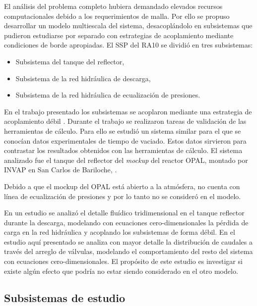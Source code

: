 El análisis del problema completo hubiera demandado elevados recursos computacionales debido a los requerimientos de malla.
Por ello se propuso desarrollar un modelo multiescala del sistema,
desacoplándolo en subsistemas que pudieron estudiarse por separado con estrategias de acoplamiento mediante condiciones de borde apropiadas.
El SSP del RA10 se dividió en tres subsistemas:

\begin{itemize}
\item Subsistema del tanque del reflector,
\item Subsistema de la red hidráulica de descarga,
\item Subsistema de la red hidráulica de ecualización de presiones.
\end{itemize}

En el trabajo presentado los subsistemas se acoplaron mediante una estrategia de acoplamiento débil \cite{ra10-paper} \cite{ra10-enief}.
Durante el trabajo se realizaron tareas de validación de las herramientas de cálculo.
Para ello se estudió un sistema similar para el que se conocían datos experimentales de tiempo de vaciado.
Estos datos sirvieron para contrastar los resultados obtenidos con las herramientas de cálculo.
El sistema analizado fue el tanque del reflector del \textit{mockup} del reactor OPAL, 
montado por INVAP en San Carlos de Bariloche, \cite{invap-mockup}.

Debido a que el mockup del OPAL está abierto a la atmósfera, no cuenta con línea de ecualización de presiones y por lo tanto no se consideró en el modelo.

En un estudio \cite{cnea-informe-mockup} se analizó el detalle fluídico tridimensional en el tanque reflector durante la descarga,
modelando con ecuaciones cero-dimensionales la pérdida de carga en la red hidráulica 
y acoplando los subsistemas de forma débil.
En el estudio aquí presentado se analiza con mayor detalle la distribución de caudales a través del arreglo de válvulas,
modelando el comportamiento del resto del sistema con ecuaciones cero-dimensionales.
El propósito de este estudio es investigar si existe algún efecto que podría no estar siendo considerado en el otro modelo.

\subsection*{Subsistemas de estudio}

